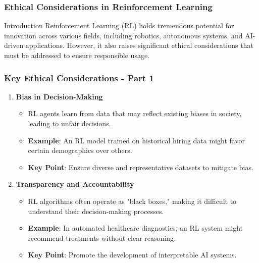 \documentclass[aspectratio=169]{beamer}
\begin{document}
\begin{frame}[fragile]
    \frametitle{Ethical Considerations in Reinforcement Learning}
    \begin{block}{Introduction}
        Reinforcement Learning (RL) holds tremendous potential for innovation across various fields, including robotics, autonomous systems, and AI-driven applications. However, it also raises significant ethical considerations that must be addressed to ensure responsible usage.
    \end{block}
\end{frame}

\begin{frame}[fragile]
    \frametitle{Key Ethical Considerations - Part 1}
    \begin{enumerate}
        \item \textbf{Bias in Decision-Making} 
        \begin{itemize}
            \item RL agents learn from data that may reflect existing biases in society, leading to unfair decisions.
            \item \textbf{Example}: An RL model trained on historical hiring data might favor certain demographics over others.
            \item \textbf{Key Point}: Ensure diverse and representative datasets to mitigate bias.
        \end{itemize}
        
        \item \textbf{Transparency and Accountability}
        \begin{itemize}
            \item RL algorithms often operate as "black boxes," making it difficult to understand their decision-making processes.
            \item \textbf{Example}: In automated healthcare diagnostics, an RL system might recommend treatments without clear reasoning.
            \item \textbf{Key Point}: Promote the development of interpretable AI systems.
        \end{itemize}
    \end{enumerate}
\end{frame}
\end{document}
